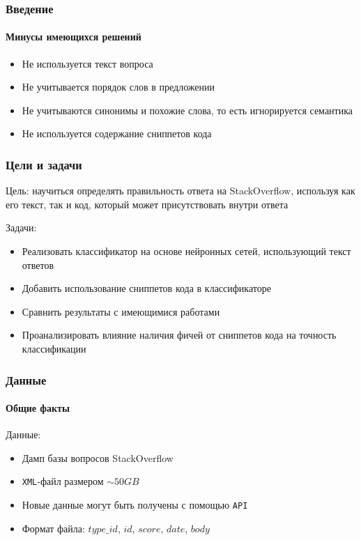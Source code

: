 \documentclass[10pt]{beamer}
\begin{document}
\begin{frame}
\frametitle{Введение}
\framesubtitle{Минусы имеющихся решений}

\begin{itemize}
	\item Не используется текст вопроса
	\item Не учитывается порядок слов в предложении
	\item Не учитываются синонимы и похожие слова, то есть игнорируется семантика
	\item Не используется содержание сниппетов кода
\end{itemize}

\end{frame}



\begin{frame}
\frametitle{Цели и задачи}

Цель: научиться определять правильность ответа на StackOverflow, используя как его текст, так и код, который может присутствовать внутри ответа

\medskip

Задачи:
\begin{itemize}
	\item Реализовать классификатор на основе нейронных сетей, использующий текст ответов
	\item Добавить использование сниппетов кода в классификаторе 
	\item Сравнить результаты с имеющимися работами
	\item Проанализировать влияние наличия фичей от сниппетов кода на точность классификации
\end{itemize}


\end{frame}


\begin{frame}
\frametitle{Данные}
\framesubtitle{Общие факты}

Данные:

\begin{itemize}
	\item Дамп базы вопросов StackOverflow
	\item \texttt{XML}-файл размером $\sim50GB$
	\item Новые данные могут быть получены с помощью \texttt{API}
	\item Формат файла: $type\_id$, $id$, $score$, $date$, $body$
\end{itemize}

\end{frame}
\end{document}

